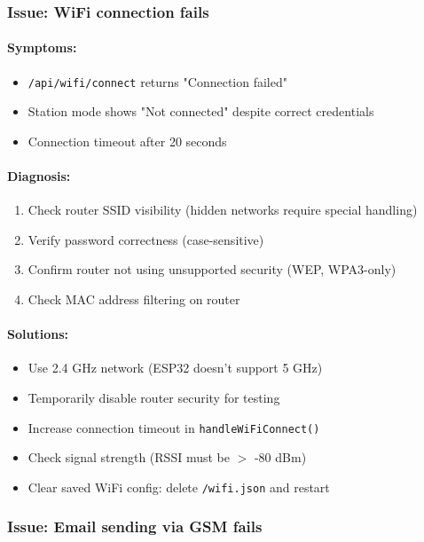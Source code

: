 \documentclass[11pt,a4paper]{article}
\begin{document}
\subsubsection{Issue: WiFi connection fails}

\paragraph{Symptoms:}
\begin{itemize}[leftmargin=*]
  \item \texttt{/api/wifi/connect} returns "Connection failed"
  \item Station mode shows "Not connected" despite correct credentials
  \item Connection timeout after 20 seconds
\end{itemize}

\paragraph{Diagnosis:}
\begin{enumerate}[leftmargin=*]
  \item Check router SSID visibility (hidden networks require special handling)
  \item Verify password correctness (case-sensitive)
  \item Confirm router not using unsupported security (WEP, WPA3-only)
  \item Check MAC address filtering on router
\end{enumerate}

\paragraph{Solutions:}
\begin{itemize}[leftmargin=*]
  \item Use 2.4 GHz network (ESP32 doesn't support 5 GHz)
  \item Temporarily disable router security for testing
  \item Increase connection timeout in \texttt{handleWiFiConnect()}
  \item Check signal strength (RSSI must be $>$ -80 dBm)
  \item Clear saved WiFi config: delete \texttt{/wifi.json} and restart
\end{itemize}

\subsubsection{Issue: Email sending via GSM fails}
\end{document}
